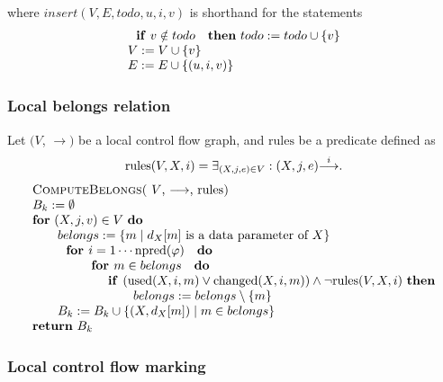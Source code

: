 where $insert(V,E,todo,u,i,v)$ is shorthand for the statements%
\begin{equation*}
\begin{array}{l}
\text{\textbf{if} }v\notin todo\text{ \textbf{then} }todo:=todo\cup \{v\} \\ 
V:=V\cup \{v\} \\ 
E:=E\cup \{(u,i,v)\}%
\end{array}%
\end{equation*}%
\newpage

\subsubsection{Local belongs relation}

Let $(V$, $\mathrm{\longrightarrow })$ be a local control flow graph, and $%
\mathrm{rules}$ be a predicate defined as%
\begin{equation*}
\mathrm{rules}(V,X,i)=\exists _{(X,j,e)\in V}:(X,j,e)\overset{i}{\mathrm{%
\longrightarrow }}.
\end{equation*}%
\begin{equation*}
\begin{tabular}{l}
\textsc{ComputeBelongs(} $V$, $\mathrm{\longrightarrow }$, $\mathrm{rules}$%
\textsc{)} \\ 
$B_{k}:=\emptyset $ \\ 
\textbf{for} $(X,j,v)\in V$ \textbf{do} \\ 
$\qquad belongs:=\{m\mid d_{X}[m]$ is a data parameter of $X\}$ \\ 
$\qquad \text{\textbf{for }}i=1\cdots \mathrm{npred}(\varphi )\text{ \textbf{%
do}}$ \\ 
$\qquad \qquad \text{\textbf{for }}m\in belongs\text{ \textbf{do}}$ \\ 
$\qquad \qquad \qquad $\textbf{if }$\left( \mathrm{used}(X,i,m)\vee \mathrm{%
changed}(X,i,m)\right) \wedge \lnot \mathrm{rules}(V,X,i)$ \textbf{then} \\ 
$\qquad \qquad \qquad \qquad belongs:=belongs\setminus \{m\}$ \\ 
$\qquad B_{k}:=B_{k}\cup \{(X,d_{X}[m])\mid m\in belongs\}$ \\ 
\textbf{return} $B_{k}$%
\end{tabular}%
\end{equation*}

\subsubsection{Local control flow marking}

